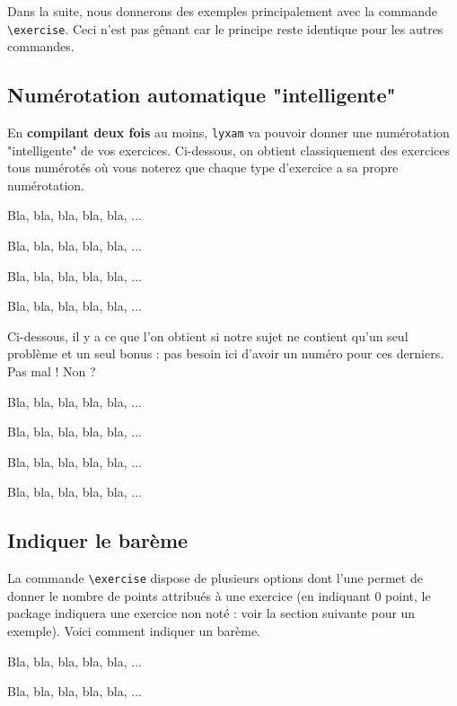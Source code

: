 \documentclass[12pt,a4paper]{article}
\makeatletter
\newcommand\resetallcnt{
		\setcounter{lyxam@topic@counter}{0}
		\setcounter{lyxam@exercise@counter}{0}
		\setcounter{lyxam@problem@counter}{0}
		\setcounter{lyxam@bonus@counter}{0}
		\setcounter{lyxam@subpart@counter}{0}
	}
\makeatother
\begin{document}
Dans la suite, nous donnerons des exemples principalement avec la commande \verb+\exercise+. Ceci n'est pas gênant car le principe reste identique pour les autres commandes.


    \subsection{Numérotation automatique "intelligente"}

En \textbf{compilant deux fois} au moins, \verb+lyxam+ va pouvoir donner une numérotation "intelligente" de vos exercices. Ci-dessous, on obtient classiquement des exercices tous numérotés où vous noterez que chaque type d'exercice a sa propre numérotation.


\begin{tcblisting}{}
\exercise
Bla, bla, bla, bla, bla, ...

\exercise
Bla, bla, bla, bla, bla, ...

\problem
Bla, bla, bla, bla, bla, ...

\problem
Bla, bla, bla, bla, bla, ...
\end{tcblisting}


Ci-dessous, il y a ce que l'on obtient si notre sujet ne contient qu'un seul problème et un seul bonus : pas besoin ici d'avoir un numéro pour ces derniers. Pas mal ! Non ?

\resetallcnt{}

\begin{tcblisting}{}
\exercise
Bla, bla, bla, bla, bla, ...

\exercise
Bla, bla, bla, bla, bla, ...

\problem
Bla, bla, bla, bla, bla, ...

\bonus
Bla, bla, bla, bla, bla, ...
\end{tcblisting}



    \subsection{Indiquer le barème}

La commande \verb+\exercise+ dispose de plusieurs options dont l'une permet de donner le nombre de points attribués à une exercice (en indiquant $0$ point, le package indiquera une exercice non noté : voir la section suivante pour un exemple). Voici comment indiquer un barème.

\resetallcnt{}

\begin{tcblisting}{}
\exercise[pts = 5]
Bla, bla, bla, bla, bla, ...

\exercise[pts = 15]
Bla, bla, bla, bla, bla, ...
\end{tcblisting}
\end{document}
